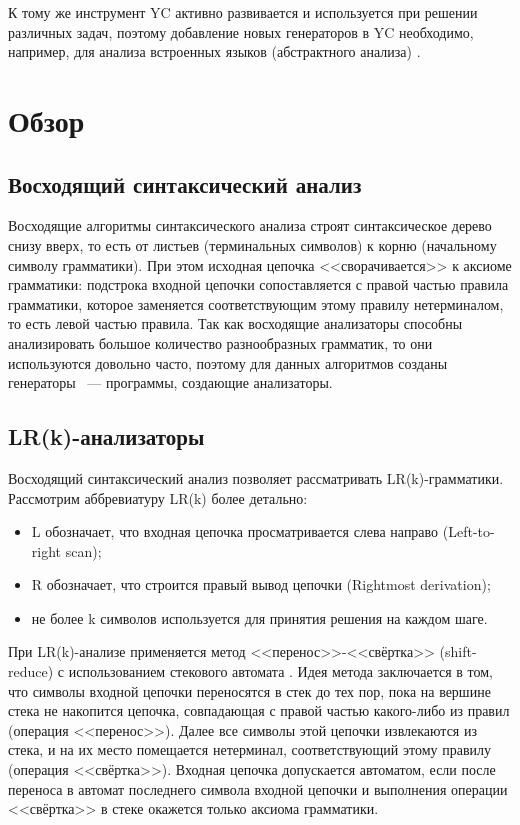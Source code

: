 \documentclass[14pt]{matmex-diploma}
\begin{document}
К тому же инструмент YC активно развивается и используется при решении различных задач, поэтому добавление новых генераторов в YC необходимо, например, для анализа встроенных языков (абстрактного анализа) \cite{abstract_parsing}.

\section{Обзор}
\subsection{Восходящий синтаксический анализ}
Восходящие алгоритмы синтаксического анализа строят синтаксическое дерево снизу вверх, то есть от листьев (терминальных символов) к корню (начальному символу грамматики). При этом исходная цепочка <<сворачивается>> к аксиоме грамматики: подстрока входной цепочки сопоставляется с правой частью правила грамматики, которое заменяется соответствующим этому правилу нетерминалом, то есть левой частью правила. Так как восходящие анализаторы способны анализировать большое количество разнообразных грамматик, то они используются довольно часто, поэтому для данных алгоритмов созданы генераторы ~--- программы, создающие анализаторы.

\subsection{LR(k)-анализаторы}
Восходящий синтаксический анализ позволяет рассматривать LR(k)-грамматики. Рассмотрим аббревиатуру LR(k) более детально:
\begin{itemize}
\item
L обозначает, что входная цепочка просматривается слева направо (Left-to-right scan);
\item
R обозначает, что строится правый вывод цепочки (Rightmost derivation);
\item
не более k символов используется для принятия решения на каждом шаге.
\end{itemize}

При LR(k)-анализе применяется метод <<перенос>>-<<свёртка>> (shift-reduce) с использованием стекового автомата \cite{book:grune}. Идея метода заключается в том, что символы входной цепочки переносятся в стек до тех пор, пока на вершине стека не накопится цепочка, совпадающая с правой частью какого-либо из правил (операция <<перенос>>). Далее все символы этой цепочки извлекаются из стека, и на их место помещается нетерминал, соответствующий этому правилу (операция <<свёртка>>). Входная цепочка допускается автоматом, если после переноса в автомат последнего символа входной цепочки и выполнения операции <<свёртка>> в стеке окажется только аксиома грамматики.
\end{document}
